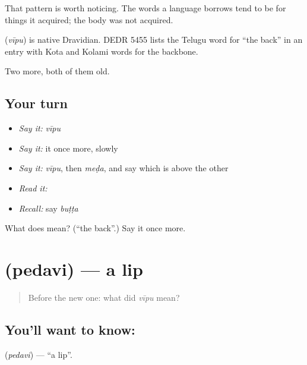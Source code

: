 That pattern is worth noticing. The words a language borrows tend to be for things it acquired; the body was not acquired.

\begin{cousinweb}
\textbf{} (\emph{vīpu}) is native Dravidian. DEDR 5455 lists the Telugu word for \textquotedblleft{}the back\textquotedblright{} in an entry with Kota and Kolami words for the backbone.
\end{cousinweb}

\begin{grammarlens}[title={What you've built}]
Two more, both of them old.
\end{grammarlens}

\subsection*{Your turn}
\begin{itemize}
\raggedright
  \item \emph{Say it:} \emph{vīpu}
  \item \emph{Say it:} it once more, slowly
  \item \emph{Say it:} \emph{vīpu}, then \emph{meḍa}, and say which is above the other
  \item \emph{Read it:} \textbf{}
  \item \emph{Recall:} say \emph{buṭṭa}
\end{itemize}

\begin{tcolorbox}[breakable,colback=teal!4,colframe=teal!35!black,title={Before you move on}]
What does  mean? (\textquotedblleft{}the back\textquotedblright{}.) Say it once more.
\end{tcolorbox}
\section[\texorpdfstring{\te{పెదవి} (pedavi)}{పెదవి (pedavi)}]{ (pedavi) — a lip}

\label{lesson:TE-C57-lip}



\begin{quote}
Before the new one: what did \emph{vīpu} mean?
\end{quote}

\subsection*{You'll want to know: }
\textbf{} (\emph{pedavi}) — \textquotedblleft{}a lip\textquotedblright{}.

